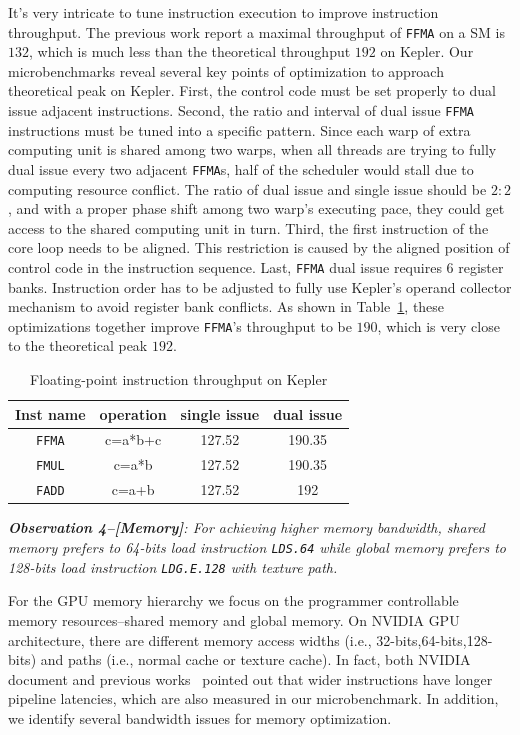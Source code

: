 \documentclass{sig-alternate-05-2015}
\begin{document}
It's very intricate to tune instruction execution to improve instruction throughput. The previous work report a maximal throughput of {\tt FFMA} on a SM is $132$, which is much less than the theoretical throughput $192$ on Kepler. Our microbenchmarks reveal several key points of optimization to approach theoretical peak on Kepler. First, the control code must be set properly to dual issue adjacent instructions. Second, the ratio and interval of dual issue {\tt FFMA} instructions must be tuned into a specific pattern. Since each warp of extra computing unit is shared among two warps, when all threads are trying to fully dual issue every two adjacent {\tt FFMA}s, half of the scheduler would stall due to computing resource conflict. The ratio of dual issue and single issue should be $2:2$, and with a proper phase shift among two warp's executing pace, they could get access to the shared computing unit in turn. Third, the first instruction of the core loop needs to be aligned. This restriction is caused by the aligned position of control code in the instruction sequence. Last, {\tt FFMA} dual issue requires 6 register banks. Instruction order has to be adjusted to fully use Kepler's operand collector mechanism to avoid register bank conflicts. As shown in Table~\ref{tab:ffma}, these optimizations together improve {\tt FFMA}'s throughput  to be $190$, which is very close to the theoretical peak $192$.

\begin{table}[htbp]
\caption{Floating-point instruction throughput on Kepler}
\centering
\scalebox{1.} {
\begin{tabular}{|c||c|c|c|}
\hline
Inst name&operation&single issue&dual issue\\
\hline
{\tt FFMA} &c=a*b+c&127.52&190.35 \\
\hline
{\tt FMUL} &c=a*b&127.52&190.35 \\
\hline
{\tt FADD} &c=a+b&127.52&192\\
\hline
\end{tabular}
}
\label{tab:ffma}
\end{table}


{\em {\bf Observation 4--[Memory]}: For achieving higher memory bandwidth, shared memory prefers to 64-bits load instruction {\tt LDS.64} while global memory prefers to 128-bits load instruction {\tt LDG.E.128} with texture path.}

For the GPU memory hierarchy we focus on the programmer controllable memory resources--shared memory and global memory. On NVIDIA GPU architecture, there are different memory access widths (i.e., 32-bits,64-bits,128-bits) and paths (i.e., normal cache or texture cache). In fact, both NVIDIA document and previous works~\cite{} pointed out that wider instructions have longer pipeline latencies, which are also measured in our microbenchmark. In addition, we identify several bandwidth issues for memory optimization.
\end{document}
